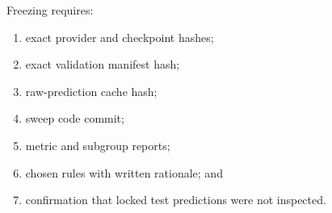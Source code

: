 Freezing  requires:

\begin{enumerate}[leftmargin=7mm]
  \item exact provider and checkpoint hashes;
  \item exact validation manifest hash;
  \item raw-prediction cache hash;
  \item sweep code commit;
  \item metric and subgroup reports;
  \item chosen rules with written rationale; and
  \item confirmation that locked test predictions were not inspected.
\end{enumerate}
